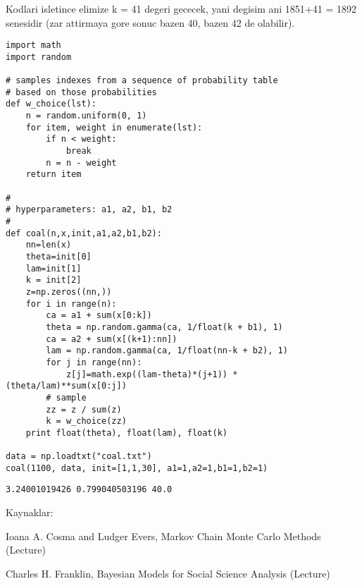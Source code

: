 \documentclass[12pt,fleqn]{article}\usepackage{../common}
\begin{document}
Kodlari isletince elimize k = 41 degeri gececek, yani degisim ani
1851+41 = 1892 senesidir (zar attirmaya gore sonuc bazen 40, bazen 42
de olabilir).

\begin{verbatim}
import math
import random

# samples indexes from a sequence of probability table
# based on those probabilities
def w_choice(lst):
    n = random.uniform(0, 1)
    for item, weight in enumerate(lst):
        if n < weight:
            break
        n = n - weight
    return item

#
# hyperparameters: a1, a2, b1, b2
#
def coal(n,x,init,a1,a2,b1,b2):
    nn=len(x)
    theta=init[0]
    lam=init[1]
    k = init[2]
    z=np.zeros((nn,))
    for i in range(n):
        ca = a1 + sum(x[0:k])
        theta = np.random.gamma(ca, 1/float(k + b1), 1) 
        ca = a2 + sum(x[(k+1):nn])
        lam = np.random.gamma(ca, 1/float(nn-k + b2), 1)
        for j in range(nn):
            z[j]=math.exp((lam-theta)*(j+1)) * (theta/lam)**sum(x[0:j])
        # sample
        zz = z / sum(z)
        k = w_choice(zz)
    print float(theta), float(lam), float(k)
                
data = np.loadtxt("coal.txt")
coal(1100, data, init=[1,1,30], a1=1,a2=1,b1=1,b2=1)
\end{verbatim}

\begin{verbatim}
3.24001019426 0.799040503196 40.0
\end{verbatim}

Kaynaklar: 

Ioana A. Cosma and Ludger Evers, Markov Chain Monte Carlo Methods (Lecture) 

Charles H. Franklin, Bayesian Models for Social Science Analysis (Lecture)
\end{document}
